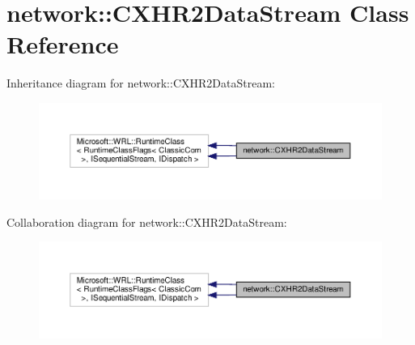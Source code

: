 \hypertarget{classnetwork_1_1CXHR2DataStream}{}\section{network\+:\+:C\+X\+H\+R2\+Data\+Stream Class Reference}
\label{classnetwork_1_1CXHR2DataStream}


Inheritance diagram for network\+:\+:C\+X\+H\+R2\+Data\+Stream\+:
\nopagebreak
\begin{figure}[H]
\begin{center}
\leavevmode
\includegraphics[width=350pt]{classnetwork_1_1CXHR2DataStream__inherit__graph}
\end{center}
\end{figure}


Collaboration diagram for network\+:\+:C\+X\+H\+R2\+Data\+Stream\+:
\nopagebreak
\begin{figure}[H]
\begin{center}
\leavevmode
\includegraphics[width=350pt]{classnetwork_1_1CXHR2DataStream__coll__graph}
\end{center}
\end{figure}
